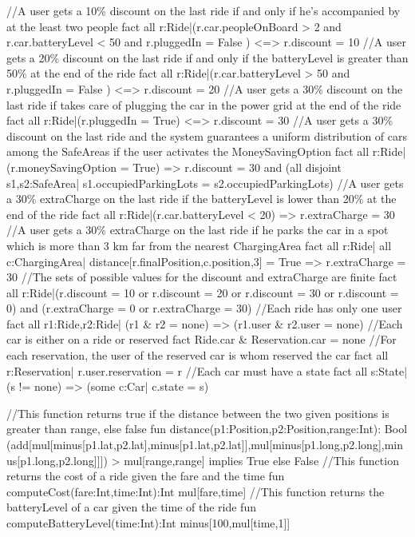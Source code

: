\documentclass[11pt,a4paper]{report}
\begin{document}
\begin{alloyCode}
{}
//A user gets a 10\% discount on the last ride if and only if he's accompanied by at the least two people
fact{
	all r:Ride|(r.car.peopleOnBoard > 2 and r.car.batteryLevel < 50 and r.pluggedIn = False ) <=> r.discount = 10
}
//A user gets a 20\% discount on the last ride if and only if the batteryLevel is greater than 50\% at the end of the ride
fact{
	all r:Ride|(r.car.batteryLevel > 50 and r.pluggedIn = False ) <=> r.discount = 20
}
//A user gets a 30\% discount on the last ride if takes care of plugging the car in the power grid at the end of the ride
fact{
	all r:Ride|(r.pluggedIn = True) <=> r.discount = 30
}
//A user gets a 30\% discount on the last ride and the system guarantees a uniform distribution of cars among the SafeAreas if the user activates the MoneySavingOption
fact{
	all r:Ride|(r.moneySavingOption = True) => r.discount = 30 and (all disjoint s1,s2:SafeArea| s1.occupiedParkingLots = s2.occupiedParkingLots)
}
//A user gets a 30\% extraCharge on the last ride if the batteryLevel is lower than 20\% at the end of the ride
fact{
	all r:Ride|(r.car.batteryLevel < 20) => r.extraCharge = 30
}
//A user gets a 30\% extraCharge on the last ride if he parks the car in a spot which is more than 3 km far from the nearest ChargingArea
fact{
	all r:Ride| all c:ChargingArea| distance[r.finalPosition,c.position,3] = True => r.extraCharge = 30
}
//The sets of possible values for the discount and extraCharge are finite
fact{
	all r:Ride|(r.discount = 10 or r.discount = 20 or r.discount = 30 or r.discount = 0) and (r.extraCharge = 0 or r.extraCharge = 30)
}
//Each ride has only one user
fact{
	all r1:Ride,r2:Ride| (r1 & r2 = none) => (r1.user & r2.user = none)
}
//Each car is either on a ride or reserved
fact{
	Ride.car & Reservation.car = none
}
//For each reservation, the user of the reserved car is whom reserved the car
fact{
	all r:Reservation| r.user.reservation = r 
}
//Each car must have a state
fact{
	all s:State| (s != none) => (some c:Car| c.state = s)
}


//This function returns true if the distance between the two given positions is greater than range, else false
fun distance(p1:Position,p2:Position,range:Int): Bool{
	(add[mul[minus[p1.lat,p2.lat],minus[p1.lat,p2.lat]],mul[minus[p1.long,p2.long],minus[p1.long,p2.long]]]) > mul[range,range] implies True else False
}
//This function returns the cost of a ride given the fare and the time
fun computeCost(fare:Int,time:Int):Int{
	mul[fare,time]
}
//This function returns the batteryLevel of a car given the time of the ride
fun computeBatteryLevel(time:Int):Int{
	minus[100,mul[time,1]]
}



\end{alloyCode}
\end{document}
